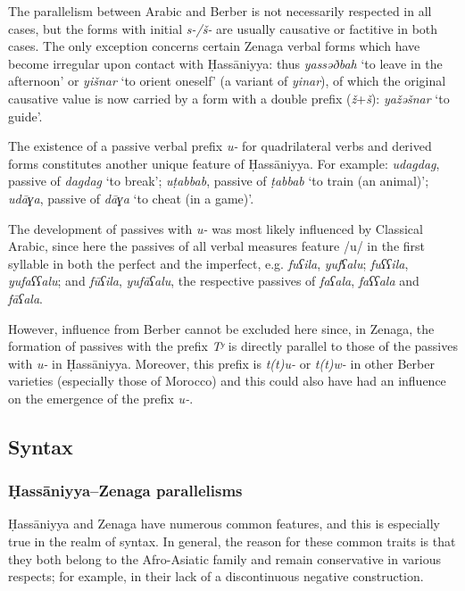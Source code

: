 \documentclass[output=paper]{langsci/langscibook}
\begin{document}
The parallelism between Arabic and Berber is not necessarily respected in all cases, but the forms with initial \textit{s-/š-} are usually causative or factitive in both cases. The only exception concerns certain Zenaga verbal forms which have become irregular upon contact with Ḥassāniyya: thus \textit{yassəðbah} ‘to leave in the afternoon’ or \textit{yišnar} ‘to orient oneself’ (a variant of \textit{yinar}), of which the original causative value is now carried by a form with a double prefix (\textit{ž}+\textit{š}): \textit{yažəšnar} ‘to guide’.


The existence of a passive verbal prefix \textit{u-} for quadrilateral verbs and derived forms constitutes another unique feature of Ḥassāniyya. For example: \textit{udagdag}, passive of \textit{dagdag} ‘to break’; \textit{uṭabbab}, passive of \textit{ṭabbab} ‘to train (an animal)’; \textit{udāɣa}, passive of \textit{dāɣa} ‘to cheat (in a game)’.

The development of passives with \textit{u-} was most likely influenced by Classical Arabic, since here the passives of all verbal measures feature /u/ in the first syllable in both the perfect and the imperfect, e.g. \textit{fuʕila}, \textit{yu}\textit{fʕalu}; \textit{fuʕʕila}, \textit{yu}\textit{faʕʕalu}; and \textit{fūʕila}, \textit{yu}\textit{fāʕalu}, the respective passives of \textit{faʕala}, \textit{faʕʕala} and \textit{fāʕala}.

However, influence from Berber cannot be excluded here since, in Zenaga, the formation of passives with the prefix \textit{Tʸ} is directly parallel to those of the passives with \textit{u-} in Ḥassāniyya. Moreover, this prefix is \textit{t(t)u-} or \textit{t(t)w-} in other Berber varieties (especially those of Morocco) and this could also have had an influence on the emergence of the prefix \textit{u-}. 

\subsection{Syntax} %

\subsubsection{Ḥassāniyya–Zenaga parallelisms} %

Ḥassāniyya and Zenaga have numerous common features, and this is especially true in the realm of syntax. In general, the reason for these common traits is that they both belong to the Afro-Asiatic family and remain conservative in various respects; for example, in their lack of a discontinuous negative construction.
\end{document}
